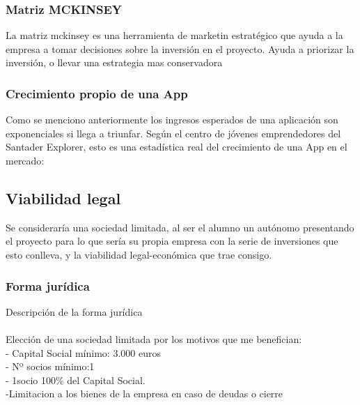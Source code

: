 \subsubsection{Matriz MCKINSEY}
La matriz mckinsey es una herramienta de marketin estratégico que ayuda a la empresa a tomar decisiones sobre la inversión en el proyecto. Ayuda a priorizar la inversión, o llevar una estrategia mas conservadora
\subsubsection{Crecimiento propio de una App}
Como se menciono anteriormente los ingresos esperados de una aplicación son exponenciales si llega a triunfar. Según el centro de jóvenes emprendedores del Santader Explorer, esto es una estadística real del crecimiento de una App en el mercado:
\subsection{Viabilidad legal}
Se consideraría una sociedad limitada, al ser el alumno un autónomo presentando el proyecto para lo que sería su propia empresa con la serie de inversiones que esto conlleva, y la viabilidad legal-económica que trae consigo.
\subsubsection{Forma jurídica}
Descripción de la forma jurídica\\
\\
Elección de una sociedad limitada por los motivos que me benefician:\\
- Capital Social mínimo: 3.000 euros  \\

- Nº socios mínimo:1 \\
- 1socio 100\% del Capital Social.\\
-Limitacion a los bienes de la empresa en caso de deudas o cierre \\
